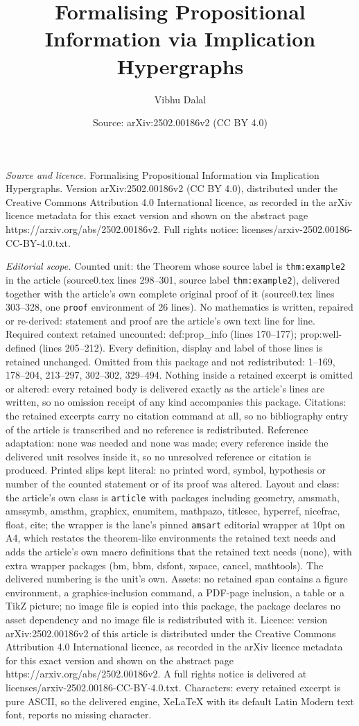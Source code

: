 \documentclass[10pt,a4paper]{amsart}
\title[Formalising Propositional Information via Implication Hyperg]{Formalising Propositional Information via Implication Hypergraphs}
\author{Vibhu Dalal}
\date{Source: arXiv:2502.00186v2 (CC BY 4.0)}
\begin{document}
\maketitle

\noindent\emph{Source and licence.} Formalising Propositional Information via Implication Hypergraphs. Version arXiv:2502.00186v2 (CC BY 4.0), distributed under the Creative Commons Attribution 4.0 International licence, as recorded in the arXiv licence metadata for this exact version and shown on the abstract page https://arxiv.org/abs/2502.00186v2. Full rights notice: licenses/arxiv-2502.00186-CC-BY-4.0.txt.\par\smallskip

\noindent\textit{Editorial scope.} Counted unit: the Theorem whose source label is \texttt{thm:example2} in the article (source0.tex lines 298--301, source label \texttt{thm:example2}), delivered together with the article's own complete original proof of it (source0.tex lines 303--328, one \texttt{proof} environment of 26 lines). No mathematics is written, repaired or re-derived: statement and proof are the article's own text line for line. Required context retained uncounted: def:prop\_info (lines 170--177); prop:well-defined (lines 205--212). Every definition, display and label of those lines is retained unchanged. Omitted from this package and not redistributed: 1--169, 178--204, 213--297, 302--302, 329--494. Nothing inside a retained excerpt is omitted or altered: every retained body is delivered exactly as the article's lines are written, so no omission receipt of any kind accompanies this package. Citations: the retained excerpts carry no citation command at all, so no bibliography entry of the article is transcribed and no reference is redistributed. Reference adaptation: none was needed and none was made; every reference inside the delivered unit resolves inside it, so no unresolved reference or citation is produced. Printed slips kept literal: no printed word, symbol, hypothesis or number of the counted statement or of its proof was altered. Layout and class: the article's own class is \texttt{article} with packages including geometry, amsmath, amssymb, amsthm, graphicx, enumitem, mathpazo, titlesec, hyperref, nicefrac, float, cite; the wrapper is the lane's pinned \texttt{amsart} editorial wrapper at 10pt on A4, which restates the theorem-like environments the retained text needs and adds the article's own macro definitions that the retained text needs (none), with extra wrapper packages (bm, bbm, dsfont, xspace, cancel, mathtools). The delivered numbering is the unit's own. Assets: no retained span contains a figure environment, a graphics-inclusion command, a PDF-page inclusion, a table or a TikZ picture; no image file is copied into this package, the package declares no asset dependency and no image file is redistributed with it. Licence: version arXiv:2502.00186v2 of this article is distributed under the Creative Commons Attribution 4.0 International licence, as recorded in the arXiv licence metadata for this exact version and shown on the abstract page https://arxiv.org/abs/2502.00186v2. A full rights notice is delivered at licenses/arxiv-2502.00186-CC-BY-4.0.txt. Characters: every retained excerpt is pure ASCII, so the delivered engine, XeLaTeX with its default Latin Modern text font, reports no missing character.
\end{document}
